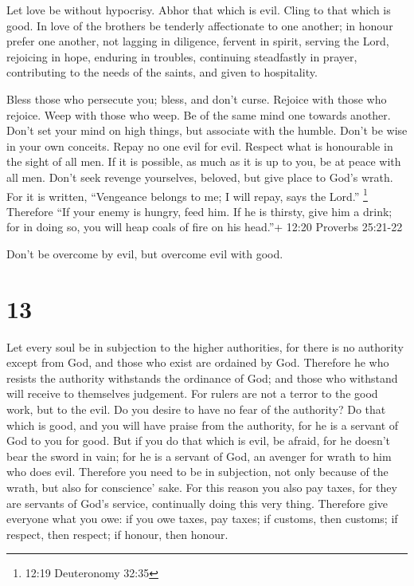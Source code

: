  Let love be without hypocrisy. Abhor that which is evil.
Cling to that which is good.  In love of the brothers be
tenderly affectionate to one another; in honour prefer one another,
 not lagging in diligence, fervent in spirit, serving the
Lord,  rejoicing in hope, enduring in troubles, continuing
steadfastly in prayer,  contributing to the needs of the
saints, and given to hospitality.

 Bless those who persecute you; bless, and don't curse.
 Rejoice with those who rejoice. Weep with those who weep.
 Be of the same mind one towards another. Don't set your
mind on high things, but associate with the humble. Don't be wise in
your own conceits.  Repay no one evil for evil. Respect
what is honourable in the sight of all men.  If it is
possible, as much as it is up to you, be at peace with all men.
 Don't seek revenge yourselves, beloved, but give place to
God's wrath. For it is written, ``Vengeance belongs to me; I will repay,
says the Lord.'' \footnote{12:19 Deuteronomy 32:35} 
Therefore ``If your enemy is hungry, feed him. If he is thirsty, give
him a drink; for in doing so, you will heap coals of fire on his
head.''+ 12:20 Proverbs 25:21-22

 Don't be overcome by evil, but overcome evil with good.

\hypertarget{section-12}{%
\section{13}\label{section-12}}

 Let every soul be in subjection to the higher authorities,
for there is no authority except from God, and those who exist are
ordained by God.  Therefore he who resists the authority
withstands the ordinance of God; and those who withstand will receive to
themselves judgement.  For rulers are not a terror to the
good work, but to the evil. Do you desire to have no fear of the
authority? Do that which is good, and you will have praise from the
authority,  for he is a servant of God to you for good. But
if you do that which is evil, be afraid, for he doesn't bear the sword
in vain; for he is a servant of God, an avenger for wrath to him who
does evil.  Therefore you need to be in subjection, not only
because of the wrath, but also for conscience' sake.  For
this reason you also pay taxes, for they are servants of God's service,
continually doing this very thing.  Therefore give everyone
what you owe: if you owe taxes, pay taxes; if customs, then customs; if
respect, then respect; if honour, then honour.

